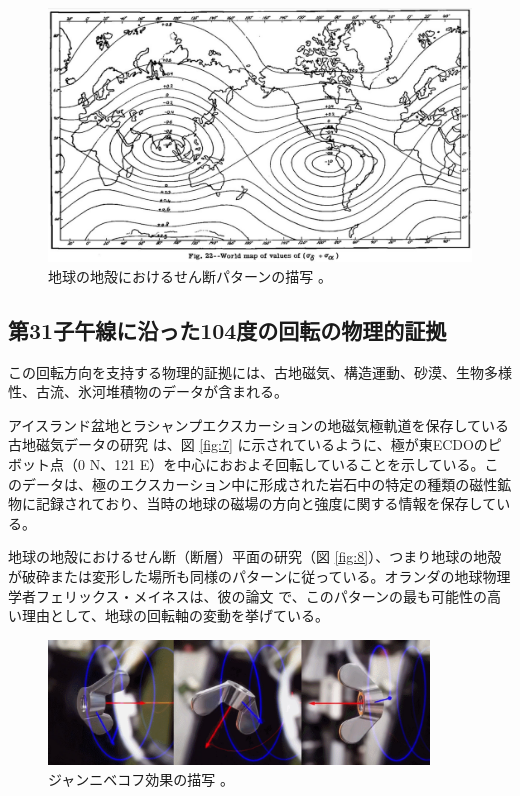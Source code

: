 \documentclass[10pt,twocolumn,letterpaper]{article}
\begin{document}
\begin{figure}[t]
\begin{center}
   \includegraphics[width=1\linewidth]{meinesz3.jpg}
\end{center}
   \caption{地球の地殻におけるせん断パターンの描写 \cite{36}。}
\label{fig:8}
\label{fig:onecol}
\end{figure}

\subsection{第31子午線に沿った104度の回転の物理的証拠}

この回転方向を支持する物理的証拠には、古地磁気、構造運動、砂漠、生物多様性、古流、氷河堆積物のデータが含まれる。

アイスランド盆地とラシャンプエクスカーションの地磁気極軌道を保存している古地磁気データの研究 \cite{35} は、図 \ref{fig:7} に示されているように、極が東ECDOのピボット点（0 N、121 E）を中心におおよそ回転していることを示している。このデータは、極のエクスカーション中に形成された岩石中の特定の種類の磁性鉱物に記録されており、当時の地球の磁場の方向と強度に関する情報を保存している。

地球の地殻におけるせん断（断層）平面の研究（図 \ref{fig:8}）、つまり地球の地殻が破砕または変形した場所も同様のパターンに従っている。オランダの地球物理学者フェリックス・メイネスは、彼の論文 \cite{36} で、このパターンの最も可能性の高い理由として、地球の回転軸の変動を挙げている。

\begin{figure}
\begin{center}
\includegraphics[width=0.9\textwidth]{dzhani.jpg}
\end{center}
   \caption{ジャンニベコフ効果の描写 \cite{28}。}
\label{fig:10}
\end{figure}
\end{document}

